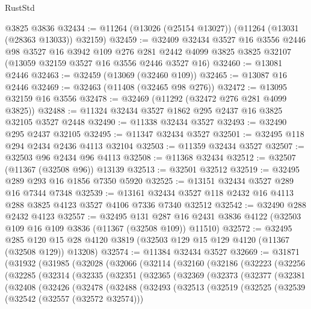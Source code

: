 \begin{lexlean}{RustStd}
\begin{coremodule}
    @3825
    @3836
@32434 := @11264 (@13026 (@25154 @13027)) (@11264 (@13031 (@28363 @13033)) @32159)
@32459 := @32409
    @32434
    @3527
    @16
    @3556
    @2446
    @98
    @3527
    @16
    @3942
    @109
    @276
    @281
    @2442
    @4099
    @3825
    @3825
    @32107
    (@13059 @32159 @3527 @16 @3556 @2446 @3527 @16)
@32460 := @13081 @2446
@32463 := @32459 (@13069 (@32460 @109))
@32465 := @13087 @16 @2446
@32469 := @32463 (@11408 (@32465 @98 @276))
@32472 := @13095 @32159 @16 @3556
@32478 := @32469 (@11292 (@32472 @276 @281 @4099 @3825))
@32488 := @11324 @32434 @3527 @1862 @295 @2437 @16 @3825 @32105 @3527 @2448
@32490 := @11338 @32434 @3527
@32493 := @32490 @295 @2437 @32105
@32495 := @11347 @32434 @3527
@32501 := @32495 @118 @294 @2434 @2436 @4113 @32104
@32503 := @11359 @32434 @3527
@32507 := @32503 @96 @2434 @96 @4113
@32508 := @11368 @32434
@32512 := @32507 (@11367 (@32508 @96)) @13139
@32513 := @32501 @32512
@32519 := @32495 @289 @293 @16 @1856 @7350 @5920
@32525 := @13151 @32434 @3527 @289 @16 @7344 @7348
@32539 := @13161 @32434 @3527 @118 @2432 @16 @4113 @288 @3825 @4123 @3527 @4106 @7336 @7340 @32512
@32542 := @32490 @288 @2432 @4123
@32557 := @32495
    @131
    @287
    @16
    @2431
    @3836
    @4122
    (@32503 @109 @16 @109 @3836 (@11367 (@32508 @109)) @11510)
@32572 := @32495
    @285
    @120
    @15
    @28
    @4120
    @3819
    (@32503 @129 @15 @129 @4120 (@11367 (@32508 @129)) @13208)
@32574 := @11384 @32434 @3527
@32669 := @31871
    (@31932
      (@31985
        (@32028
          (@32066
            (@32114
              (@32160
                (@32186
                  (@32223
                    (@32256
                      (@32285
                        (@32314
                          (@32335
                            (@32351
                              (@32365
                                (@32369
                                  (@32373
                                    (@32377
                                      (@32381
                                        (@32408
                                          (@32426
                                            (@32478
                                              (@32488
                                                (@32493
                                                  (@32513
                                                    (@32519
                                                      (@32525
                                                        (@32539
                                                          (@32542 (@32557 (@32572 @32574)))

\end{coremodule}
\end{lexlean}
